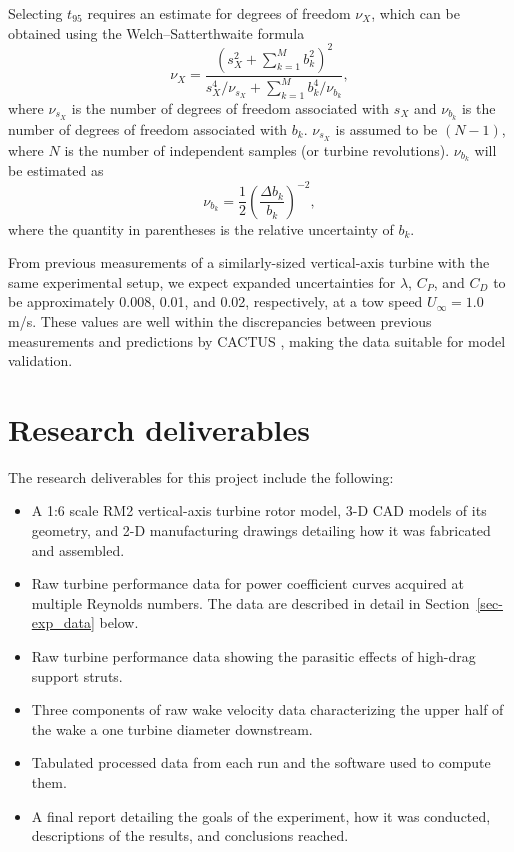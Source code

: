 \documentclass[12pt,letterpaper]{scrreprt}
\begin{document}
Selecting $t_{95}$ requires an estimate for degrees of freedom $\nu_X$, which can
be obtained using the Welch--Satterthwaite formula
\begin{equation}
\nu_X = \frac{\left(s_X^2 + \sum_{k=1}^M b_k^2 \right)^2}
             {s_X^4/\nu_{s_X} + \sum_{k=1}^M b_k^4/\nu_{b_k}},
\end{equation}
where $\nu_{s_X}$ is the number of degrees of freedom associated with $s_X$ and
$\nu_{b_k}$ is the number of degrees of freedom associated with $b_k$.
$\nu_{s_X}$ is assumed to be $(N-1)$, where $N$ is the number of independent
samples (or turbine revolutions). $\nu_{b_k}$ will be estimated as
\begin{equation}
\nu_{b_k} = \frac{1}{2} \left( \frac{\Delta b_k}{b_k} \right)^{-2},
\end{equation}
where the quantity in parentheses is the relative uncertainty of $b_k$.

From previous measurements of a similarly-sized vertical-axis turbine with the
same experimental setup, we expect expanded uncertainties for $\lambda$, $C_P$,
and $C_D$ to be approximately 0.008, 0.01, and 0.02, respectively, at a tow
speed $U_\infty = 1.0$ m/s. These values are well within the discrepancies
between previous measurements and predictions by CACTUS \cite{Michelen2014},
making the data suitable for model validation.

\chapter{Research deliverables}

The research deliverables for this project include the following:

\begin{itemize}

    \item A 1:6 scale RM2 vertical-axis turbine rotor model, 3-D CAD models of
    its geometry, and 2-D manufacturing drawings detailing how it was fabricated
    and assembled.
    
    \item Raw turbine performance data for power coefficient curves acquired at
    multiple Reynolds numbers. The data are described in detail in
    Section~\ref{sec-exp_data} below.
    
    \item Raw turbine performance data showing the parasitic effects of
    high-drag support struts.
    
    \item Three components of raw wake velocity data characterizing the upper
    half of the wake a one turbine diameter downstream.
    
    \item Tabulated processed data from each run and the software used to
    compute them.
    
    \item A final report detailing the goals of the experiment, how it was
    conducted, descriptions of the results, and conclusions reached.

\end{itemize}
\end{document}
